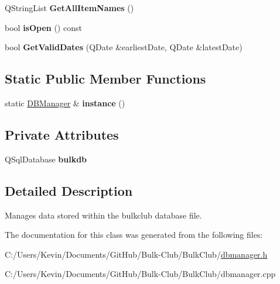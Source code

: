 \begin{DoxyCompactItemize}
\item 
\mbox{\label{class_d_b_manager_a77808e923dc7acdf78a468a5dcef023f}} 
Q\+String\+List {\bfseries Get\+All\+Item\+Names} ()
\item 
\mbox{\label{class_d_b_manager_a987f90b871cb3ae67cb89ea1cc324995}} 
bool {\bfseries is\+Open} () const
\item 
\mbox{\label{class_d_b_manager_a639cfdc44d6faa7848f0c51f3b9003ad}} 
bool {\bfseries Get\+Valid\+Dates} (Q\+Date \&earliest\+Date, Q\+Date \&latest\+Date)
\end{DoxyCompactItemize}
\subsection*{Static Public Member Functions}
\begin{DoxyCompactItemize}
\item 
\mbox{\label{class_d_b_manager_a3d41dae808e8eb17d62a83c0b8a257c3}} 
static \mbox{\hyperlink{class_d_b_manager}{D\+B\+Manager}} \& {\bfseries instance} ()
\end{DoxyCompactItemize}
\subsection*{Private Attributes}
\begin{DoxyCompactItemize}
\item 
\mbox{\label{class_d_b_manager_a98bdcc2ff763cf208e71d24b6d7c8f96}} 
Q\+Sql\+Database {\bfseries bulkdb}
\end{DoxyCompactItemize}


\subsection{Detailed Description}
Manages data stored within the bulkclub database file. 

The documentation for this class was generated from the following files\+:\begin{DoxyCompactItemize}
\item 
C\+:/\+Users/\+Kevin/\+Documents/\+Git\+Hub/\+Bulk-\/\+Club/\+Bulk\+Club/\mbox{\hyperlink{dbmanager_8h}{dbmanager.\+h}}\item 
C\+:/\+Users/\+Kevin/\+Documents/\+Git\+Hub/\+Bulk-\/\+Club/\+Bulk\+Club/dbmanager.\+cpp\end{DoxyCompactItemize}
